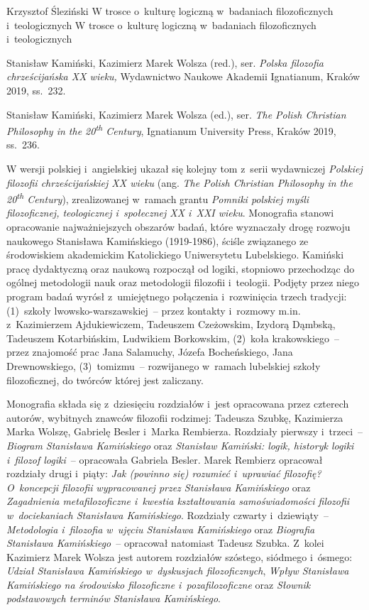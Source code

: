 \begin{recplenv}{Krzysztof Śleziński}
	{W trosce o~kulturę logiczną w~badaniach filozoficznych i~teologicznych}
	{W trosce o~kulturę logiczną w~badaniach filozoficznych\\i~teologicznych}
	{Stanisław Kamiński, Kazimierz Marek Wolsza (red.), ser. \textit{Polska filozofia chrześcijańska XX wieku,}
		Wydawnictwo Naukowe Akademii Ignatianum, Kraków 2019, ss.~232.
		
		Stanisław Kamiński, Kazimierz Marek Wolsza (ed.), ser. \textit{The Polish Christian Philosophy in the
			20\textsuperscript{th} Century}, Ignatianum University Press, Kraków 2019, ss.~236.}







W wersji polskiej i~angielskiej ukazał się kolejny tom z~serii wydawniczej \textit{Polskiej filozofii chrześcijańskiej
XX wieku} (ang. \textit{The Polish Christian Philosophy in the 20\textsuperscript{th} Century}),
zrealizowanej w~ramach grantu \textit{Pomniki polskiej myśli filozoficznej,
teologicznej i~społecznej XX i~XXI wieku}. Monografia stanowi opracowanie najważniejszych obszarów badań, które
wyznaczały drogę rozwoju naukowego Stanisława Kamińskiego (1919-1986), ściśle związanego ze środowiskiem akademickim
Katolickiego Uniwersytetu Lubelskiego. Kamiński pracę dydaktyczną oraz naukową rozpoczął od logiki, stopniowo
przechodząc do ogólnej metodologii nauk oraz metodologii filozofii i~teologii. Podjęty przez niego program badań wyrósł
z~umiejętnego połączenia i~rozwinięcia trzech tradycji: (1)~szkoły lwowsko-warszawskiej~-- przez kontakty i~rozmowy
m.in. z~Kazimierzem Ajdukiewiczem, Tadeuszem Czeżowskim, Izydorą Dąmbską, Tadeuszem Kotarbińskim, Ludwikiem Borkowskim,
(2)~koła krakowskiego~-- przez znajomość prac Jana Salamuchy, Józefa Bocheńskiego, Jana Drewnowskiego,
(3)~tomizmu~-- rozwijanego w~ramach lubelskiej szkoły filozoficznej, do twórców której jest zaliczany.

Monografia składa się z~dziesięciu rozdziałów i~jest opracowana przez czterech autorów, wybitnych znawców filozofii
rodzimej: Tadeusza Szubkę, Kazimierza Marka Wolszę, Gabrielę Besler i~Marka Rembierza. Rozdziały
pierwszy i~trzeci~-- \textit{Biogram Stanisława Kamińskiego} oraz \textit{Stanisław Kamiński: logik,
historyk logiki i~filozof  logiki}~-- opracowała Gabriela Besler.
Marek Rembierz opracował rozdziały drugi i~piąty:  \textit{Jak (powinno się)
rozumieć i~uprawiać filozofię? O~koncepcji filozofii }\textit{wypracowanej przez Stanisława Kamińskiego} oraz \textit{Zagadnienia
metafilozoficzne i~kwestia kształtowania samoświadomości filozofii w~dociekaniach Stanisława Kamińskiego}. Rozdziały
czwarty i~dziewiąty~-- \textit{Metodologia i~filozofia w~ujęciu Stanisława Kamińskiego} oraz  \textit{Biografia
Stanisława Kamińskiego}~-- opracował natomiast Tadeusz Szubka. Z~kolei Kazimierz Marek Wolsza jest autorem rozdziałów
szóstego, siódmego i~ósmego: \textit{Udział Stanisława Kamińskiego w~dyskusjach filozoficznych}, \textit{Wpływ
Stanisława Kamińskiego na środowisko filozoficzne i~pozafilozoficzne} oraz \textit{Słownik podstawowych terminów
Stanisława Kamińskiego}. 


\end{recplenv}
